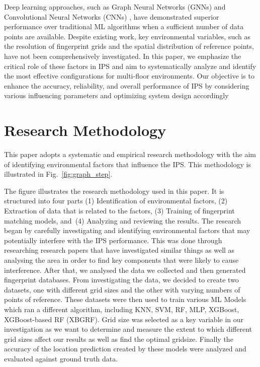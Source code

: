 \documentclass[conference]{IEEEtran}
\begin{document}
	Deep learning approaches, such as Graph Neural Networks (GNNs) \cite{LRE2} and Convolutional Neural Networks (CNNs) \cite{LRE4}, have demonstrated superior performance over traditional ML algorithms when a sufficient number of data points are available. Despite existing work, key environmental variables, such as the resolution of fingerprint grids and the spatial distribution of reference points, have not been comprehensively investigated. In this paper, we emphasize the critical role of these factors in IPS and aim to systematically analyze and identify the most effective configurations for multi-floor environments. Our objective is to enhance the accuracy, reliability, and overall performance of IPS by considering various influencing parameters and optimizing system design accordingly
	
	
	
	\section{Research Methodology}
	This paper adopts a systematic and empirical research methodology with the aim of identifying environmental factors that influence the IPS. This methodology is illustrated in Fig.~\ref{fig:graph_step}.
	
	The figure illustrates the research methodology used in this paper. It is structured into four parts (1) Identification of environmental factors, (2) Extraction of data that is related to the factors, (3) Training of fingerprint matching models, and~(4) Analyzing and reviewing the results. The research began by carefully investigating and identifying environmental factors that may potentially interfere with the IPS performance. This was done through researching research papers that have investigated similar things as well as analysing the area in order to find key components that were likely to cause interference. After that, we analysed the data we collected and then generated fingerprint databases. From investigating the data, we decided to create two datasets, one with different grid sizes and the other with varying numbers of points of reference. These datasets were then used to train various ML Models which ran a different algorithm, including KNN, SVM, RF, MLP, XGBoost, XGBoost-based RF (XBGRF). Grid size was selected as a key variable in our investigation as we want to determine and measure the extent to which different grid sizes affect our results as well as find the optimal gridsize. Finally the accuracy of the location prediction created by these models were analyzed and evaluated against ground truth data.
	
\end{document}
